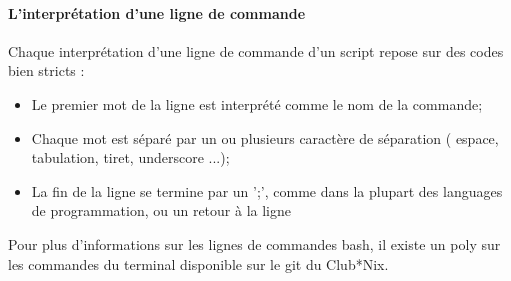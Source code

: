 \paragraph{L'interprétation d'une ligne de commande}

Chaque interprétation d'une ligne de commande d'un script repose sur des codes bien stricts :
\begin{itemize}
  \item Le premier mot de la ligne est interprété comme le nom de la commande;
  \item Chaque mot est séparé par un ou plusieurs caractère de séparation ( espace, tabulation, tiret, underscore ...);
  \item La fin de la ligne se termine par un ';', comme dans la plupart des languages de programmation, ou un retour à la ligne
\end{itemize}


Pour plus d'informations sur les lignes de commandes bash, il existe un poly sur les commandes du terminal disponible sur le git du Club*Nix.
